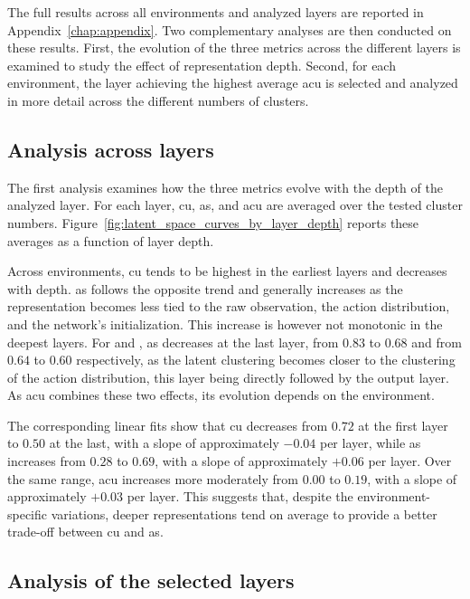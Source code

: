 The full results across all environments and analyzed layers are reported in Appendix~\ref{chap:appendix}.
Two complementary analyses are then conducted on these results.
First, the evolution of the three metrics across the different layers is examined to study the effect of representation depth.
Second, for each environment, the layer achieving the highest average \gls{acu} is selected and analyzed in more detail across the different numbers of clusters.

\subsection{Analysis across layers}

The first analysis examines how the three metrics evolve with the depth of the analyzed layer.
For each layer, \gls{cu}, \gls{as}, and \gls{acu} are averaged over the tested cluster numbers.
Figure~\ref{fig:latent_space_curves_by_layer_depth} reports these averages as a function of layer depth.

Across environments, \gls{cu} tends to be highest in the earliest layers and decreases with depth.
\gls{as} follows the opposite trend and generally increases as the representation becomes less tied to the raw observation, the action distribution, and the network's initialization.
This increase is however not monotonic in the deepest layers.
For \MarioBrosName and \MsPacManName, \gls{as} decreases at the last layer, from $0.83$ to $0.68$ and from $0.64$ to $0.60$ respectively, as the latent clustering becomes closer to the clustering of the action distribution, this layer being directly followed by the output layer.
As \gls{acu} combines these two effects, its evolution depends on the environment.

The corresponding linear fits show that \gls{cu} decreases from $0.72$ at the first layer to $0.50$ at the last, with a slope of approximately $-0.04$ per layer, while \gls{as} increases from $0.28$ to $0.69$, with a slope of approximately $+0.06$ per layer.
Over the same range, \gls{acu} increases more moderately from $0.00$ to $0.19$, with a slope of approximately $+0.03$ per layer.
This suggests that, despite the environment-specific variations, deeper representations tend on average to provide a better trade-off between \gls{cu} and \gls{as}.



\subsection{Analysis of the selected layers}

